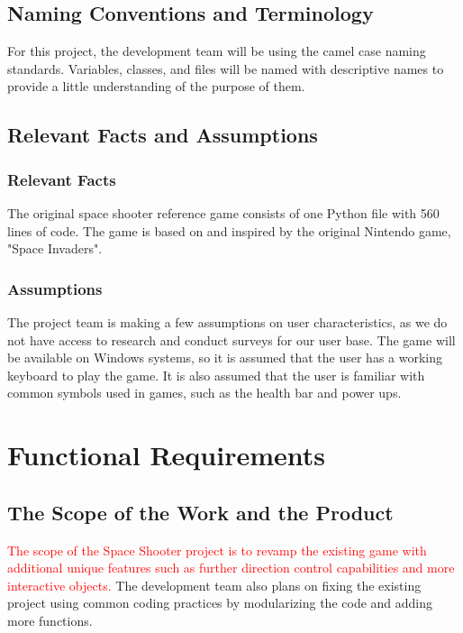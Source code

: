 \documentclass[12pt, titlepage]{article}
\begin{document}
\subsection{Naming Conventions and Terminology}

For this project, the development team will be using the camel case naming standards. Variables,  classes, and files will be named with descriptive names to provide a little understanding of the purpose of them. 

\subsection{Relevant Facts and Assumptions}

\subsubsection{Relevant Facts}

The original space shooter reference game consists of one Python file with 560 lines of code. The game is based on and inspired by the original Nintendo game, "Space Invaders". 

\subsubsection{Assumptions}

The project team is making a few assumptions on user characteristics, as we do not have access to research and conduct surveys for our user base. The game will be available on Windows systems, so it is assumed that the user has a working keyboard to play the game. It is also assumed that the user is familiar with common symbols used in games, such as the health bar and power ups.   


\section{Functional Requirements}

\subsection{The Scope of the Work and the Product}
\textcolor{red}{The scope of the Space Shooter project is to revamp the existing game with additional unique features such as further direction control capabilities and more interactive objects.} The development team also plans on fixing the existing project using common coding practices by modularizing the code and adding more functions.
\end{document}
